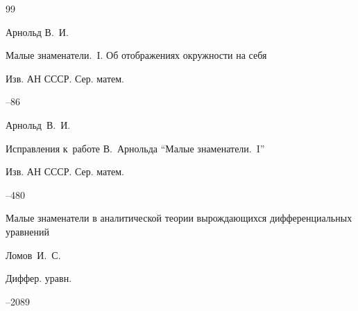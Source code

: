 \begin{thebibliography}{99}












\by  Арнольд В.~И.

\paper Малые знаменатели.~I. Об отображениях окружности на себя

\jour Изв. АН СССР. Сер. матем.




--86




\morerref

\by Арнольд~В.~И.

\paper Исправления к~работе В.~Арнольда ``Малые знаменатели.~I''

\jour Изв. АН СССР. Сер. матем.




--480









\paper Малые знаменатели в аналитической теории вырождающихся дифференциальных уравнений

\by  Ломов~И.~С.

\jour Диффер. уравн.




--2089








\end{thebibliography}





